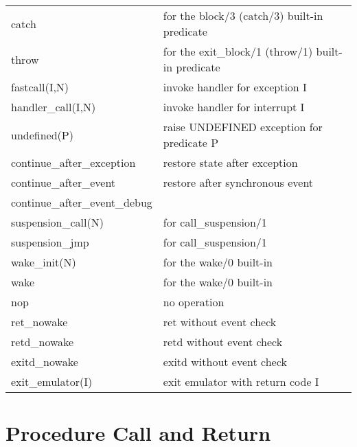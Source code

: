 \begin{tabular}{|p{}|p{}|}
\hline
catch           & for the block/3 (catch/3) built-in predicate \\
throw           & for the exit_block/1 (throw/1) built-in predicate \\
\hline
fastcall(I,N)           & invoke handler for exception I \\
handler_call(I,N)       & invoke handler for interrupt I \\
undefined(P)            & raise UNDEFINED exception for predicate P \\
continue_after_exception& restore state after exception \\
\hline
continue_after_event            & restore after synchronous event \\
continue_after_event_debug      & \\
\hline
suspension_call(N)      & for call_suspension/1 \\
suspension_jmp          & for call_suspension/1 \\
\hline
wake_init(N)            & for the wake/0 built-in \\
wake                    & for the wake/0 built-in \\
\hline
nop                     & no operation \\
\hline
ret_nowake              & ret without event check \\
retd_nowake             & retd without event check \\
exitd_nowake            & exitd without event check \\
\hline
exit_emulator(I)        & exit emulator with return code I \\
\hline
\end{tabular}


\section{Procedure Call and Return}
\label{seccallret}

